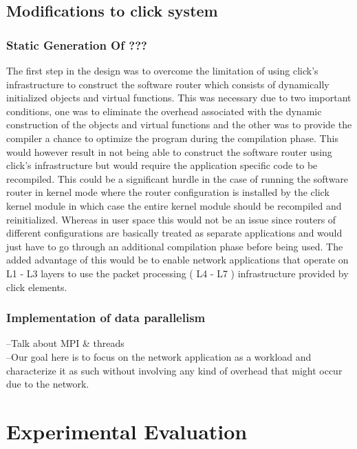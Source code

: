 \documentclass[conference]{IEEEtran}
\begin{document}
\subsection{Modifications to click system}

\subsubsection{Static Generation Of ???}
The first step in the design was to overcome the limitation of using click's infrastructure to construct the software router which consists of dynamically initialized objects and virtual functions. This was necessary due to two important conditions, one was to eliminate the overhead associated with the dynamic construction of the objects and virtual functions and the other was to provide the compiler a chance to optimize the program during the compilation phase. This would however result in not being able to construct the software router using click's infrastructure but would require the application specific code to be recompiled. This could be a significant hurdle in the case of running the software router in kernel mode where the router configuration is installed by the click kernel module in which case the entire kernel module should be recompiled and reinitialized. Whereas in user space this would not be an issue since routers of different configurations are basically treated as separate applications and would just have to go through an additional compilation phase before being used. The added advantage of this would be to enable network applications that operate on L1 - L3 layers to use the packet processing ( L4 - L7 ) infrastructure provided by click elements.

\subsubsection{Implementation of data parallelism}


--Talk about MPI \& threads\\

--Our goal here is to focus on the network application as a workload and characterize it as such without involving any kind of overhead that might occur due to the network.\\



\section{Experimental Evaluation}
\end{document}

